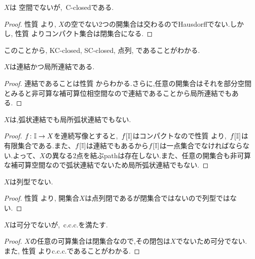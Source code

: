 \documentclass[uplatex, dvipdfmx, a4paper, 12pt, class=jsbook, crop=false]{standalone}
\begin{document}
\begin{property}
	$X$は \Hausdorff 空間でないが,\ C-closedである.
\end{property}

\begin{proof}
	性質  より, $X$の空でない2つの開集合は交わるのでHausdorffでない.しかし, 性質  よりコンパクト集合は閉集合になる.
\end{proof}

このことから, KC-closed, SC-closed, 点列\Hausdorff, であることがわかる.

\begin{property}
	$X$は連結かつ局所連結である.
\end{property}

\begin{proof}
	連結であることは性質  からわかる.さらに,任意の開集合はそれを部分空間とみると非可算な補可算位相空間なので連結であることから局所連結でもある.
\end{proof}

\begin{property}
	$X$は,弧状連結でも局所弧状連結でもない.
\end{property}

\begin{proof}
	$f \colon \mathbb{I} \to X$を連続写像とすると,\ $f[\mathbb{I}]$はコンパクトなので性質  より,\ $f[\mathbb{I}]$は有限集合である.また、$f[\mathbb{I}]$は連結でもあるから$f[\mathbb{I}]$は一点集合でなければならない.よって、$X$の異なる2点を結ぶpathは存在しない.また、任意の開集合も非可算な補可算空間なので弧状連結でないため局所弧状連結でもない.
\end{proof}

\begin{property}
	$X$は列型でない.
\end{property}

\begin{proof}
	性質  より, 開集合$X$は点列閉であるが閉集合ではないので列型ではない.
\end{proof}

\begin{property}
	$X$は可分でないが,\ c.c.c.を満たす.
\end{property}

\begin{proof}
	$X$の任意の可算集合は閉集合なので,その閉包は$X$でないため可分でない.また, 性質  よりc.c.c.であることがわかる.
\end{proof}
\end{document}
